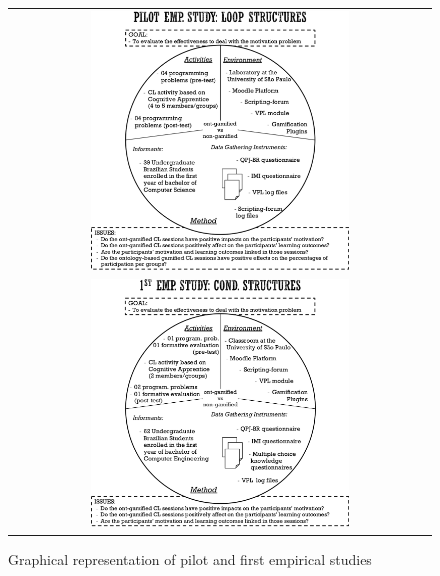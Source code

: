 \newpage
\begin{figure}[htb]
 \caption{Graphical representation of pilot and first empirical studies}
 \label{fig:graphical-pilot-first-empirical-study}
 \centering
 \begin{tabular}{c}
  \includegraphics[width=0.63\textwidth]{images/chap-evaluation/graphical-pilot-empirical-study}\\
  \includegraphics[width=0.63\textwidth]{images/chap-evaluation/graphical-first-empirical-study}
 \end{tabular}
 \fautor
\end{figure}

